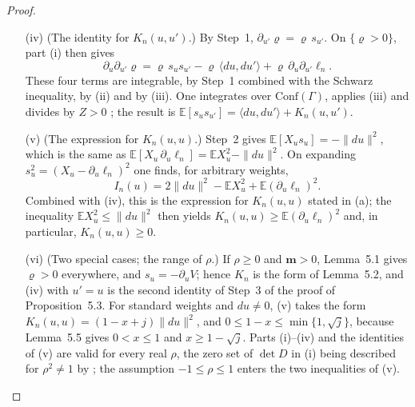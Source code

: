 \documentclass[11pt]{amsart}
\theoremstyle{definition}
\begin{document}
\begin{proof}
\begin{itemize}
By Step~1 of the proof of Proposition~5.3 and \cite[Definition~2.6]{QEDII}, the integral $\int\mathrm d(A,z)\,(\partial_{u'}\varrho)(A+tu,z)$ does not depend on $t$.
When $|t|\le1$, the derivative in $t$ of the integrand, namely $(\partial_u\partial_{u'}\varrho)(A+tu,z)$, is bounded in modulus by $C\prod_\sigma\exp(-\frac14F_\sigma^2)$ for some constant $C$, and this function is integrable, as in Step~2 of that proof \cite[Lemma~3.14]{QEDII}.
Differentiating at $t=0$, one obtains
\begin{equation*}
\int\mathrm d(A,z)\,\partial_u\partial_{u'}\varrho=0.
\end{equation*}
\item[(iv)] (The identity for $K_n(u,u')$.)
By Step~1, $\partial_{u'}\varrho=\varrho\,s_{u'}$.
On $\{\varrho>0\}$, part (i) then gives
\begin{equation*}
\partial_u\partial_{u'}\varrho=\varrho\,s_us_{u'}-\varrho\,\langle du,du'\rangle+\varrho\,\partial_u\partial_{u'}\ell_n.
\end{equation*}
These four terms are integrable, by Step~1 combined with the Schwarz inequality, by (ii) and by (iii).
One integrates over $\mathrm{Conf}(\Gamma)$, applies (iii) and divides by $Z>0$ \cite[Theorem~4.26]{QEDII}; the result is $\mathbb E[s_us_{u'}]=\langle du,du'\rangle+K_n(u,u')$.
\item[(v)] (The expression for $K_n(u,u)$.)
Step~2 gives $\mathbb E[X_us_u]=-\|du\|^2$, which is the same as $\mathbb E[X_u\,\partial_u\ell_n]=\mathbb EX_u^2-\|du\|^2$.
On expanding $s_u^2=(X_u-\partial_u\ell_n)^2$ one finds, for arbitrary weights,
\begin{equation*}
I_n(u)=2\|du\|^2-\mathbb EX_u^2+\mathbb E(\partial_u\ell_n)^2.
\end{equation*}
Combined with (iv), this is the expression for $K_n(u,u)$ stated in (a); the inequality $\mathbb EX_u^2\le\|du\|^2$ \cite[Theorem~6.27\,(b)]{QEDII} then yields $K_n(u,u)\ge\mathbb E(\partial_u\ell_n)^2$ and, in particular, $K_n(u,u)\ge0$.
\item[(vi)] (Two special cases; the range of $\rho$.)
If $\rho\ge0$ and $\mathbf m>0$, Lemma~5.1 gives $\varrho>0$ everywhere, and $s_u=-\partial_uV$; hence $K_n$ is the form of Lemma~5.2, and (iv) with $u'=u$ is the second identity of Step~3 of the proof of Proposition~5.3.
For standard weights and $du\ne0$, (v) takes the form $K_n(u,u)=(1-x+j)\|du\|^2$, and $0\le1-x\le\min\{1,\sqrt j\}$, because Lemma~5.5 gives $0<x\le1$ and $x\ge1-\sqrt j$.
Parts (i)--(iv) and the identities of (v) are valid for every real $\rho$, the zero set of $\det D$ in (i) being described for $\rho^2\ne1$ by \cite[Theorem~4.13\,(e)]{QEDII}; the assumption $-1\le\rho\le1$ enters the two inequalities of (v).
\end{itemize}


\end{proof}
\end{document}
